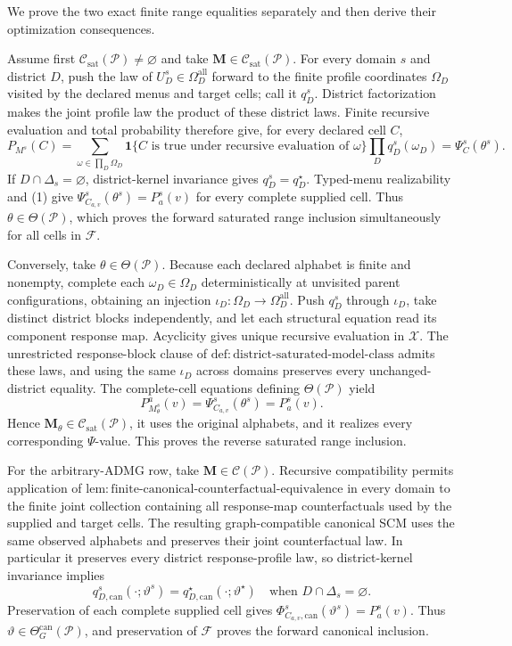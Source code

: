 We prove the two exact finite range equalities separately and then derive their optimization consequences.

Assume first \(\mathcal C_{\mathrm{sat}}(\mathcal P)\ne\varnothing\) and take \(\mathbf M\in\mathcal C_{\mathrm{sat}}(\mathcal P)\).  For every domain \(s\) and district \(D\), push the law of \(U_D^s\in\Omega_D^{\mathrm{all}}\) forward to the finite profile coordinates \(\Omega_D\) visited by the declared menus and target cells; call it \(q_D^s\).  District factorization makes the joint profile law the product of these district laws.  Finite recursive evaluation and total probability therefore give, for every declared cell \(C\),
\[
P_{M^s}(C)
=\sum_{\omega\in\prod_D\Omega_D}
\mathbf 1\{C\text{ is true under recursive evaluation of }\omega\}
\prod_Dq_D^s(\omega_D)
=\Psi_C^s(\theta^s).
\tag{1}
\]
If \(D\cap\Delta_s=\varnothing\), district-kernel invariance gives \(q_D^s=q_D^\star\).  Typed-menu realizability and (1) give
\(\Psi_{C_{a,v}}^s(\theta^s)=P_a^s(v)\) for every complete supplied cell.  Thus \(\theta\in\Theta(\mathcal P)\), which proves the forward saturated range inclusion simultaneously for all cells in \(\mathcal F\).

Conversely, take \(\theta\in\Theta(\mathcal P)\).  Because each declared alphabet is finite and nonempty, complete each \(\omega_D\in\Omega_D\) deterministically at unvisited parent configurations, obtaining an injection \(\iota_D:\Omega_D\to\Omega_D^{\mathrm{all}}\).  Push \(q_D^s\) through \(\iota_D\), take distinct district blocks independently, and let each structural equation read its component response map.  Acyclicity gives unique recursive evaluation in \(\mathcal X\).  The unrestricted response-block clause of \(\mathrm{def:district\text{-}saturated\text{-}model\text{-}class}\) admits these laws, and using the same \(\iota_D\) across domains preserves every unchanged-district equality.  The complete-cell equations defining \(\Theta(\mathcal P)\) yield
\[
P_{M_\theta^s}^a(v)=\Psi_{C_{a,v}}^s(\theta^s)=P_a^s(v).
\]
Hence \(\mathbf M_\theta\in\mathcal C_{\mathrm{sat}}(\mathcal P)\), it uses the original alphabets, and it realizes every corresponding \(\Psi\)-value.  This proves the reverse saturated range inclusion.

For the arbitrary-ADMG row, take \(\mathbf M\in\mathcal C(\mathcal P)\).  Recursive compatibility permits application of \(\mathrm{lem:finite\text{-}canonical\text{-}counterfactual\text{-}equivalence}\) in every domain to the finite joint collection containing all response-map counterfactuals used by the supplied and target cells.  The resulting graph-compatible canonical SCM uses the same observed alphabets and preserves their joint counterfactual law.  In particular it preserves every district response-profile law, so district-kernel invariance implies
\[
q_{D,\mathrm{can}}^s(\cdot;\vartheta^s)
=q_{D,\mathrm{can}}^\star(\cdot;\vartheta^\star)
\quad\text{when }D\cap\Delta_s=\varnothing.
\]
Preservation of each complete supplied cell gives
\(\Phi_{C_{a,v},\mathrm{can}}^s(\vartheta^s)=P_a^s(v)\).  Thus \(\vartheta\in\Theta_G^{\mathrm{can}}(\mathcal P)\), and preservation of \(\mathcal F\) proves the forward canonical inclusion.

